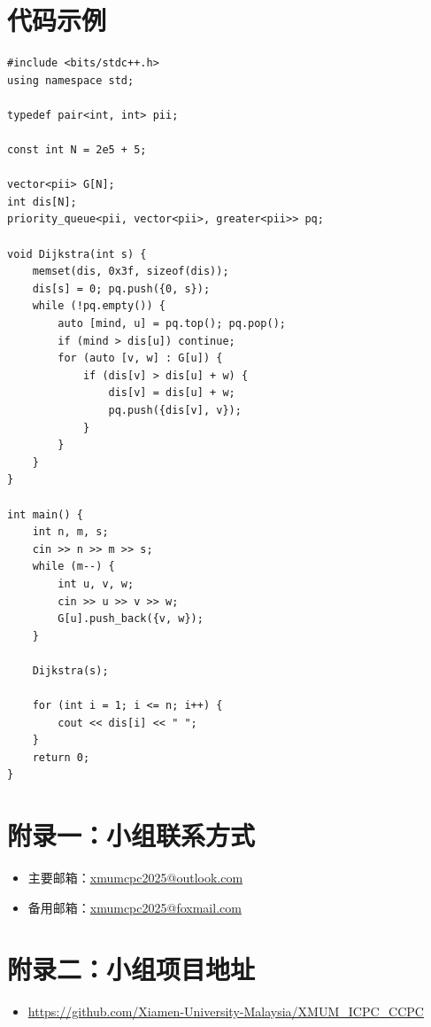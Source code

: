 \documentclass{xmum_icpc_ccpc_article}
\begin{document}
\newpage

\section{代码示例}
\begin{lstlisting}
#include <bits/stdc++.h>
using namespace std;

typedef pair<int, int> pii;

const int N = 2e5 + 5;

vector<pii> G[N];
int dis[N];
priority_queue<pii, vector<pii>, greater<pii>> pq;

void Dijkstra(int s) {
    memset(dis, 0x3f, sizeof(dis));
    dis[s] = 0; pq.push({0, s});
    while (!pq.empty()) {
        auto [mind, u] = pq.top(); pq.pop();
        if (mind > dis[u]) continue;
        for (auto [v, w] : G[u]) {
            if (dis[v] > dis[u] + w) {
                dis[v] = dis[u] + w;
                pq.push({dis[v], v});
            }
        }
    }
}

int main() {
    int n, m, s;
    cin >> n >> m >> s;
    while (m--) {
        int u, v, w;
        cin >> u >> v >> w;
        G[u].push_back({v, w});
    }
    
    Dijkstra(s);
    
    for (int i = 1; i <= n; i++) {
        cout << dis[i] << " ";
    }
    return 0;
}
\end{lstlisting}

\newpage
\XMUMMarkRealLastPage

\section*{附录一：小组联系方式}
\begin{itemize}
    \item 主要邮箱：\url{xmumcpc2025@outlook.com}
    \item 备用邮箱：\url{xmumcpc2025@foxmail.com}
\end{itemize}

\section*{附录二：小组项目地址}
\begin{itemize}
    \item \url{https://github.com/Xiamen-University-Malaysia/XMUM_ICPC_CCPC}
\end{itemize}

\newpage
{}

\XMUMSchoolBackgroundPageBlue
\XMUMSchoolBackgroundPageWhite
\XMUMSchoolBackgroundPageColor

\XMUMLogoPage
\XMUMLogoPageWithBackground
\end{document}
